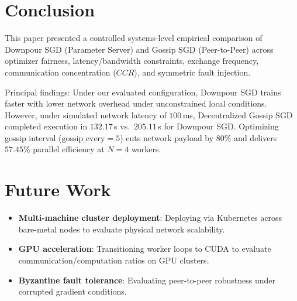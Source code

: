\documentclass[conference]{IEEEtran}
\begin{document}
\section{Conclusion}

This paper presented a controlled systems-level empirical comparison of Downpour SGD (Parameter Server) and Gossip SGD (Peer-to-Peer) across optimizer fairness, latency/bandwidth constraints, exchange frequency, communication concentration ($CCR$), and symmetric fault injection.

Principal findings: Under our evaluated configuration, Downpour SGD trains faster with lower network overhead under unconstrained local conditions. However, under simulated network latency of $100$\,ms, Decentralized Gossip SGD completed execution in $132.17$\,s vs.\ $205.11$\,s for Downpour SGD. Optimizing gossip interval ($\text{gossip\_every}=5$) cuts network payload by $80\%$ and delivers $57.45\%$ parallel efficiency at $N=4$ workers.

\section{Future Work}

\begin{itemize}
    \item \textbf{Multi-machine cluster deployment}: Deploying via Kubernetes across bare-metal nodes to evaluate physical network scalability.
    \item \textbf{GPU acceleration}: Transitioning worker loops to CUDA to evaluate communication/computation ratios on GPU clusters.
    \item \textbf{Byzantine fault tolerance}: Evaluating peer-to-peer robustness under corrupted gradient conditions.
\end{itemize}
\end{document}
